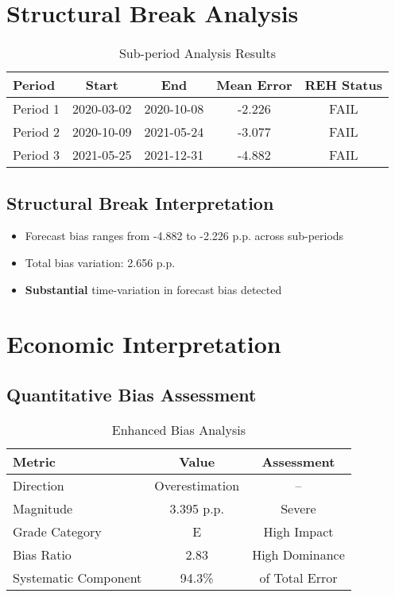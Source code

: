 \documentclass[11pt,a4paper]{article}
\begin{document}
\section{Structural Break Analysis}

\begin{table}[H]
\centering
\caption{Sub-period Analysis Results}
\begin{tabular}{lcccc}
\toprule
\textbf{Period} & \textbf{Start} & \textbf{End} & \textbf{Mean Error} & \textbf{REH Status} \\
\midrule
Period 1 & 2020-03-02 & 2020-10-08 & -2.226 & \textcolor{academicred}{FAIL} \\
Period 2 & 2020-10-09 & 2021-05-24 & -3.077 & \textcolor{academicred}{FAIL} \\
Period 3 & 2021-05-25 & 2021-12-31 & -4.882 & \textcolor{academicred}{FAIL} \\
\bottomrule
\end{tabular}
\end{table}

\subsection{Structural Break Interpretation}
\begin{itemize}
\item Forecast bias ranges from -4.882 to -2.226 p.p. across sub-periods
\item Total bias variation: 2.656 p.p.
\item \textbf{Substantial} time-variation in forecast bias detected
\end{itemize}

\section{Economic Interpretation}

\subsection{Quantitative Bias Assessment}
\begin{table}[H]
  \centering
  \caption{Enhanced Bias Analysis}
  \begin{tabular}{lcc}
    \toprule
    \textbf{Metric}      & \textbf{Value} & \textbf{Assessment} \\
    \midrule
    Direction            & Overestimation & --                  \\
    Magnitude            & 3.395 p.p.     & Severe              \\
    Grade Category       & E              & High Impact         \\
    Bias Ratio           & 2.83           & High Dominance      \\
    Systematic Component & 94.3\%         & of Total Error      \\
    \bottomrule
  \end{tabular}
\end{table}
\end{document}
